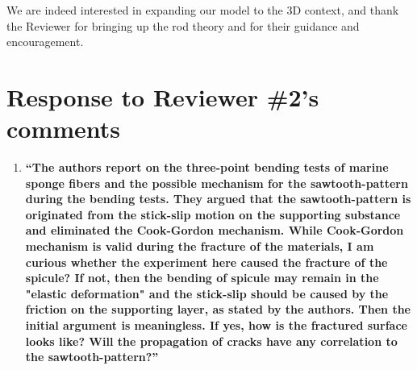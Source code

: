 \documentclass[11pt,letterpaper]{report}
\begin{document}
\begin{enumerate}[label=\textit{1.\arabic*},wide, labelwidth=!, labelindent=0pt]

We are indeed interested in expanding our model to the 3D context, and thank the Reviewer for bringing up the rod theory and for their guidance and encouragement.







\clearpage

\section*{Response to Reviewer \#2's comments}
\label{rev2}

\begin{enumerate}[label=\textit{2.\arabic*},wide, labelindent=0pt]

\item \label{r2c1}{\bf ``The authors report on the three-point bending tests of marine sponge fibers and the possible mechanism for the sawtooth-pattern during the bending tests. They argued that the sawtooth-pattern is originated from the stick-slip motion on the supporting substance and eliminated the Cook-Gordon mechanism.
While Cook-Gordon mechanism is valid during the fracture of the materials, I am curious whether the experiment here caused the fracture of the spicule?
If not, then the bending of spicule may remain in the "elastic deformation" and the stick-slip should be caused by the friction on the supporting layer, as stated by the authors. Then the initial argument is meaningless.
If yes, how is the fractured surface looks like? Will the propagation of cracks have any correlation to the sawtooth-pattern?''}




\end{enumerate}
\end{enumerate}
\end{document}
